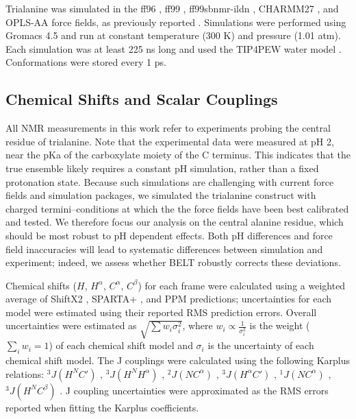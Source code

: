 \documentclass[journal=jacsat,manuscript=article]{achemso}
\begin{document}
Trialanine was simulated in the ff96 \cite{kollman1996}, ff99 \cite{wang2000}, ff99sbnmr-ildn \cite{li2010, Lindorff-Larsen2010}, CHARMM27 \cite{mackerell2004extending,bjelkmar2010implementation}, and OPLS-AA \cite{kaminski2001evaluation} force fields, as previously reported  \cite{beauchamp2012protein}.  Simulations were performed using Gromacs 4.5  \cite{hess2008} and run at constant temperature (300 K) and pressure (1.01 atm).  Each simulation was at least 225 ns long and used the TIP4PEW water model \cite{horn2004}.  Conformations were stored every 1 ps.  

\subsection*{Chemical Shifts and Scalar Couplings}

All NMR measurements in this work refer to experiments  \cite{Graf2007} probing the central residue of trialanine.  Note that the experimental data were measured at pH 2, near the pKa of the carboxylate moiety of the C terminus.  This indicates that the true ensemble likely requires a constant pH simulation, rather than a fixed protonation state.  Because such simulations are challenging with current force fields and simulation packages, we simulated the trialanine construct with charged termini--conditions at which the the force fields have been best calibrated and tested.  We therefore focus our analysis on the central alanine residue, which should be most robust to pH dependent effects.  Both pH differences and force field inaccuracies will lead to systematic differences  between simulation and experiment; indeed, we assess whether BELT robustly corrects these deviations.  

Chemical shifts ($H$, $H^\alpha$, $C^\alpha$, $C^\beta$) for each frame were calculated using a weighted average of ShiftX2 \cite{han2011shiftx2}, SPARTA+  \cite{Shen2010}, and PPM \cite{li2012ppm} predictions; uncertainties for each model were estimated using their reported RMS prediction errors.  Overall uncertainties were estimated as $\sqrt{\sum w_i \sigma_i^2}$, where $w_i \propto \frac{1}{\sigma_i^2}$ is the weight ($\sum_i w_i = 1$) of each chemical shift model and $\sigma_i$ is the uncertainty of each chemical shift model.  The J couplings were calculated using the following Karplus relations: $^3J(H^N C')$  \cite{vogeli2007limits}, $^3J(H^N H^\alpha)$  \cite{vogeli2007limits}, $^2J(N C^\alpha)$  \cite{Graf2007}, $^3J(H^\alpha C')$  \cite{Schmidt1999}, $^1J(N C^\alpha)$  \cite{Graf2007}, $^3J(H^N C^\beta)$  \cite{vogeli2007limits}.  J coupling uncertainties were approximated as the RMS errors reported when fitting the Karplus coefficients.  
\end{document}
